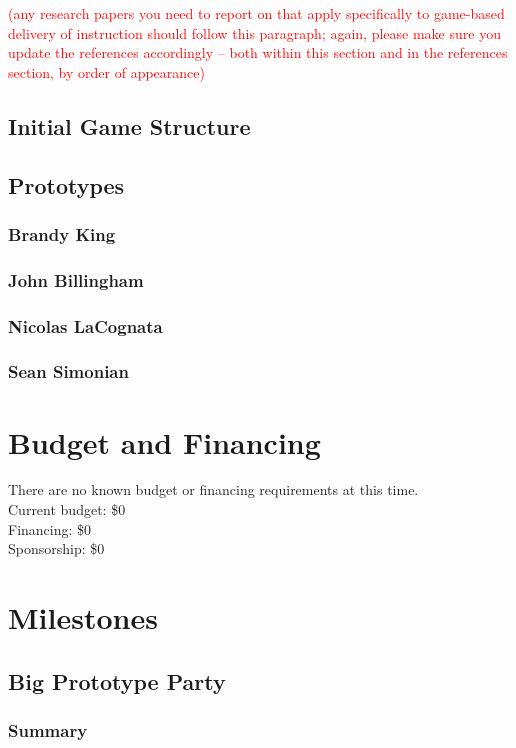 \documentclass{article}
\newcommand\todo[1]{\textcolor{red}{#1}}
\begin{document}
\todo{(any research papers you need to report on that apply specifically to
game-based delivery of instruction should follow this paragraph; again, please
make sure you update the references accordingly -- both within this section and
in the references section, by order of appearance)}

\subsection{Initial Game Structure}

\subsection{Prototypes}
\subsubsection{Brandy King}
\subsubsection{John Billingham}
\subsubsection{Nicolas LaCognata}
\subsubsection{Sean Simonian}

\newpage
\section{Budget and Financing}
There are no known budget or financing requirements at this time.\\
Current budget: \$0\\
Financing: \$0\\
Sponsorship: \$0\\

\newpage
\section{Milestones}

\subsection{Big Prototype Party}
\subsubsection{Summary}
\end{document}
